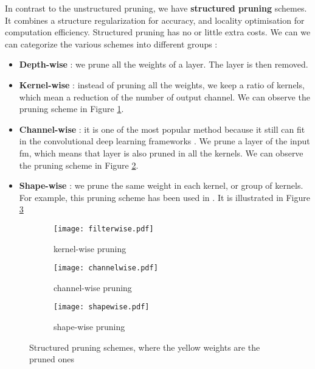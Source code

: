 In contrast to the unstructured pruning, we have \textbf{structured pruning} schemes. It combines a structure regularization for accuracy, and locality optimisation for computation efficiency. Structured pruning has no or little extra costs. We can we can categorize the various schemes into different groups \cite{wen_learning_2016, anwar_structured_2017, cheng_recent_2018, kang_accelerator-aware_2020}:
\begin{itemize}
    \item \textbf{Depth-wise} : we prune all the weights of a layer. The layer is then removed.
    \item \textbf{Kernel-wise} : instead of pruning all the weights, we keep a ratio of kernels, which mean a reduction of the number of output channel. We can observe the pruning scheme in Figure \ref{fig:struct_pruning:fw}.
    \item \textbf{Channel-wise} : it is one of the most popular method because it still can fit in the convolutional deep learning frameworks \cite{liu_rethinking_2019}. We prune a layer of the input \acrshort{fm}, which means that layer is also pruned in all the kernels. We can observe the pruning scheme in Figure \ref{fig:struct_pruning:chw}.
    \item \textbf{Shape-wise} : we prune the same weight in each kernel, or group of kernels. For example, this pruning scheme has been used in \textcite{zhu_efficient_2020}. It is illustrated in Figure \ref{fig:struct_pruning:sw}
\end{itemize}
%
\begin{figure}
    \centering
    \begin{subfigure}{.32\textwidth}
    \centering
    \texttt{[image: filterwise.pdf]}
    \caption{kernel-wise pruning}
    \label{fig:struct_pruning:fw}
    \end{subfigure}
    \begin{subfigure}{.32\textwidth}
    \centering
    \texttt{[image: channelwise.pdf]}
    \caption{channel-wise pruning}
    \label{fig:struct_pruning:chw}
    \end{subfigure}
    \begin{subfigure}{.32\textwidth}
    \centering
    \texttt{[image: shapewise.pdf]}
    \caption{shape-wise pruning}
    \label{fig:struct_pruning:sw}
    \end{subfigure}
    \caption{Structured pruning schemes, where the yellow weights are the pruned ones}
    \label{fig:struct_pruning}
\end{figure}
